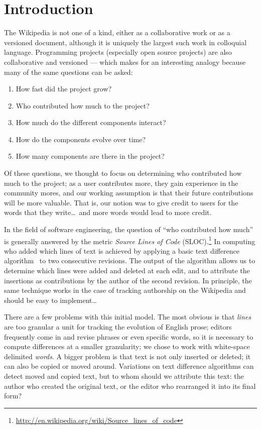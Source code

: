
\section{Introduction}
\label{sec:diff-intro}

The Wikipedia is not one of a kind, either as a collaborative work or as
a versioned document, although it is uniquely the largest such work
in colloquial language.
Programming projects (especially open source projects)
are also collaborative and versioned --- which makes for
an interesting analogy because many of the same questions can be asked:
\begin{enumerate}
\item How fast did the project grow?
\item Who contributed how much to the project?
\item How much do the different components interact?
\item How do the components evolve over time?
\item How many components are there in the project?
\end{enumerate}
Of these questions, we thought to focus on determining who contributed
how much to the project; as a user contributes more, they gain experience
in the community mores, and our working assumption is that their future
contributions will be more valuable.
That is, our notion was to give credit to users for the words that
they write\ldots\ and more words would lead to more credit.

In the field of software engineering, the question of ``who contributed
how much'' is generally answered by the metric
\textit{Source Lines of Code} (SLOC).\footnote{\url{http://en.wikipedia.org/wiki/Source_lines_of_code}}
In computing who added which lines of text is achieved
by applying a basic text difference
algorithm~\cite{Myers1986,Tichy1984,Burns1997} to two consecutive
revisions.
The output of the algorithm allows us to determine which lines were added and
deleted at each edit, and to attribute the insertions as contributions by the
author of the second revision.
In principle, the same technique works in the case of tracking authorship
on the Wikipedia and should be easy to implement\ldots

There are a few problems with this initial model.
The most obvious is that \textit{lines} are too granular
a unit for tracking the evolution of English prose;
editors frequently come in and revise phrases or
even specific words, so it is necessary to compute
differences at a smaller granularity;
we chose to work with white-space delimited \textit{words}.
A bigger problem is that text is not only inserted
or deleted; it can also be copied or moved around.
Variations on text difference algorithms can
detect moved and copied text, but to whom should we attribute this text:
the author who created the original text, or the editor who rearranged it
into its final form?

